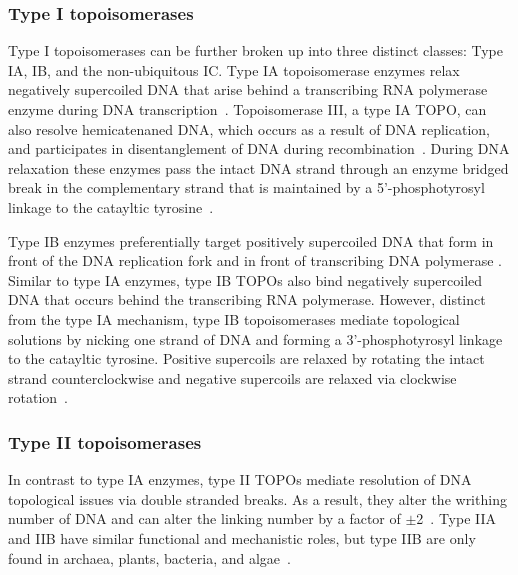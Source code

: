 \documentclass[12pt]{article}
\begin{document}
\subsubsection{Type I topoisomerases}\label{TOPO1}

Type I topoisomerases can be further broken up into three distinct classes: Type IA, IB, and the non-ubiquitous IC. Type IA topoisomerase enzymes relax negatively supercoiled DNA that arise behind a transcribing RNA polymerase enzyme during DNA transcription~\cite{Vos:2011cra}. Topoisomerase III, a type IA TOPO, can also resolve hemicatenaned DNA, which occurs as a result of DNA replication, and participates in disentanglement of DNA during recombination~\cite{DiGate:1988ts,Lopez:2005fh}. During DNA relaxation these enzymes pass the intact DNA strand through an enzyme bridged break in the complementary strand that is maintained by a 5'-phosphotyrosyl linkage to the catayltic tyrosine~\cite{Schoeffler:2008dl}.

\vspace{5pt}

Type IB enzymes preferentially target positively supercoiled DNA that form in front of the DNA replication fork and in front of transcribing DNA polymerase \cite{Champoux:2001cc}. Similar to type IA enzymes, type IB TOPOs also bind negatively supercoiled DNA that occurs behind the transcribing RNA polymerase. However, distinct from the type IA mechanism, type IB topoisomerases mediate topological solutions by nicking one strand of DNA and forming a 3'-phosphotyrosyl linkage to the catayltic tyrosine. Positive supercoils are relaxed by rotating the intact strand counterclockwise and negative supercoils are relaxed via clockwise rotation~\cite{Stewart:1998te}. 
\vspace{-10pt}
\subsubsection{Type II topoisomerases}\label{TOPOII}

In contrast to type IA enzymes, type II TOPOs mediate resolution of DNA topological issues via double stranded breaks. As a result, they alter the writhing number of DNA and can alter the linking number by a factor of $\pm$2~\cite{Champoux:2001cc}. Type IIA and IIB have similar functional and mechanistic roles, but type IIB are only found in archaea, plants, bacteria, and algae~\cite{Vos:2011cra}. 

\vspace{5pt}
\end{document}
